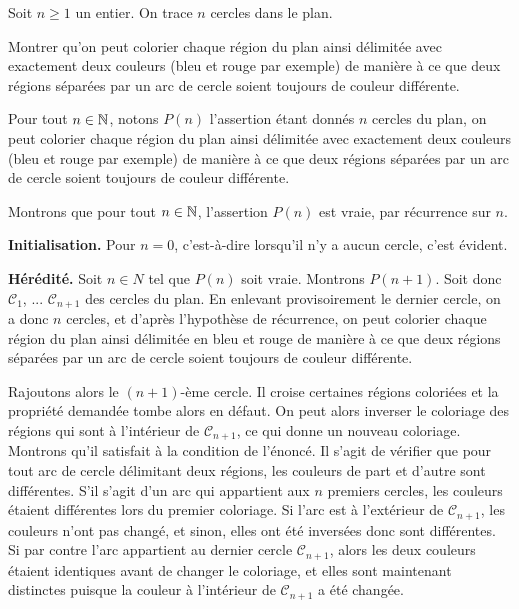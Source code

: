 \begin{exo}[Coloriage]
\begin{multicols}{2}
\null \vfill
Soit $n\geq 1$ un entier. On trace $n$ cercles dans le plan.

Montrer qu'on peut colorier chaque région du plan ainsi délimitée avec exactement deux couleurs (bleu et rouge par exemple) de manière à ce que deux régions séparées par un arc de cercle soient toujours de couleur différente.
\vfill \null    
\columnbreak
\begin{center}
\end{center}
\end{multicols}
\begin{sol}
Pour tout $n\in \mathbb N$, notons $P(n)$ l'assertion \og  étant donnés $n$ cercles du plan, on peut colorier chaque région du plan ainsi délimitée avec exactement deux couleurs (bleu et rouge par exemple) de manière à ce que deux régions séparées par un arc de cercle soient toujours de couleur différente.\fg

Montrons que pour tout $n\in \mathbb N$, l'assertion $P(n)$ est vraie, par récurrence sur $n$.

\noindent \textbf{Initialisation.} Pour $n=0$, c'est-à-dire lorsqu'il n'y a aucun cercle, c'est évident.

\noindent \textbf{Hérédité.} Soit $n\in N$ tel que $P(n)$ soit vraie. Montrons $P(n+1)$. Soit donc $\mathcal C_1$, ... $\mathcal C_{n+1}$ des cercles du plan. En enlevant provisoirement le dernier cercle, on a donc $n$ cercles, et d'après l'hypothèse de récurrence, on peut colorier chaque région du plan ainsi délimitée en bleu et rouge de manière à ce que deux régions séparées par un arc de cercle soient toujours de couleur différente.

Rajoutons alors le $(n+1)$-ème cercle. Il croise certaines régions coloriées et la propriété demandée tombe alors en défaut. On peut alors inverser le coloriage des régions qui sont à l'intérieur de $\mathcal C_{n+1}$, ce qui donne un nouveau coloriage. Montrons qu'il satisfait à la condition de l'énoncé. Il s'agit de vérifier que pour tout arc de cercle délimitant deux régions, les couleurs de part et d'autre sont différentes. S'il s'agit d'un arc qui appartient aux $n$ premiers cercles, les couleurs étaient différentes lors du premier coloriage. Si l'arc est à l'extérieur de $\mathcal C_{n+1}$, les couleurs n'ont pas changé, et sinon, elles ont été inversées donc sont différentes. Si par contre l'arc appartient au dernier cercle $\mathcal C_{n+1}$, alors les deux couleurs étaient identiques avant de changer le coloriage, et elles sont maintenant distinctes puisque la couleur à l'intérieur de $\mathcal C_{n+1}$ a été changée.


\end{sol}
\end{exo}
